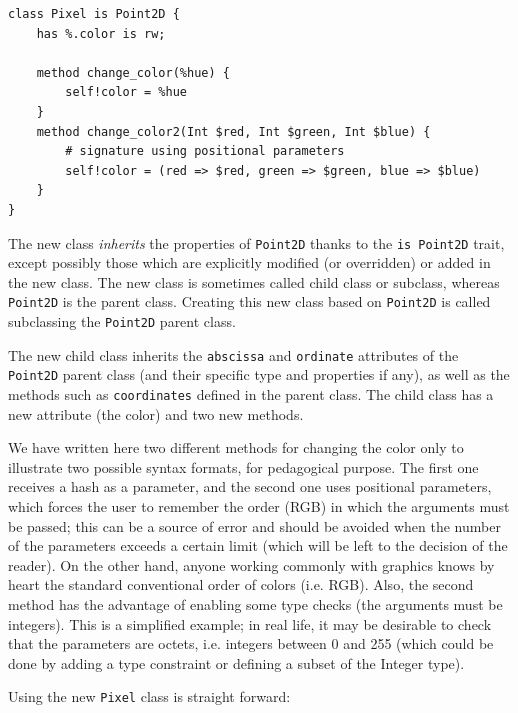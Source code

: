\begin{verbatim}
class Pixel is Point2D {
    has %.color is rw;

    method change_color(%hue) {
        self!color = %hue
    }
    method change_color2(Int $red, Int $green, Int $blue) {
        # signature using positional parameters
        self!color = (red => $red, green => $green, blue => $blue)
    }
}
\end{verbatim}

The new class \emph{inherits} the properties of {\tt Point2D} 
thanks to the {\tt is Point2D} trait, except possibly those 
which are explicitly modified (or overridden) or added in 
the new class. The new class is sometimes 
called child class or subclass, whereas {\tt Point2D} is the 
parent class. Creating this new class based on 
{\tt Point2D} is called subclassing the {\tt Point2D} 
parent class. 

The new child class inherits the {\tt abscissa} and 
{\tt ordinate} attributes of the {\tt Point2D} parent 
class (and their specific type and properties if any), 
as well as the methods such as {\tt coordinates} defined 
in the parent class. The child class  has a new 
attribute (the color) and two new methods.

We have written here two different methods for changing the color 
only to illustrate two possible syntax formats, for pedagogical 
purpose. The first one receives a hash as a parameter, and 
the second one uses positional parameters, which forces 
the user to remember the order (RGB) in which the arguments must 
be passed; this can be a source of error and should be avoided 
when the number of the parameters exceeds a certain limit 
(which will be left to the decision of the reader). On the other 
hand, anyone working commonly with graphics knows by heart the 
standard conventional order of colors (i.e. RGB). Also, 
the second method has the 
advantage of enabling some type checks (the arguments must 
be integers). This is a simplified example; in real life, it 
may be desirable to check that the parameters are octets, i.e. 
integers between 0 and 255 (which could be done by adding a 
type constraint or defining a subset of the Integer type).

Using the new {\tt Pixel} class is straight forward:

